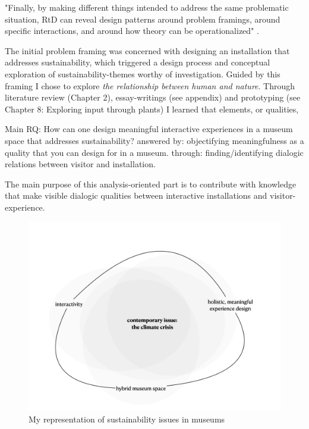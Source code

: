 
"Finally, by making different things intended to address the same problematic situation, RtD can reveal design patterns \autocite{Alexander_book} around problem framings, around specific interactions, and around how theory can be operationalized" \autocite[p. 178]{zimmerman_research_2014}.


The initial problem framing was concerned with designing an installation that addresses sustainability, which triggered a design process and conceptual exploration of sustainability-themes worthy of investigation. Guided by this framing I chose to explore \emph{the relationship between human and nature}. Through literature review (Chapter 2), essay-writings (see appendix) and prototyping (see Chapter 8: Exploring input through plants) I learned that elements, or qualities,


Main RQ: How can one design meaningful interactive experiences in a museum space that addresses sustainability?
answered by: objectifying meaningfulness as a quality that you can design for in a museum.
through: finding/identifying dialogic relations between visitor and installation.


The main purpose of this analysis-oriented part is to contribute with knowledge that make visible dialogic qualities between interactive installations and visitor-experience. 



\begin{figure}[H]
\centering
\includegraphics[width=12.5cm]{pictures/Theory/problem_sphere.png}
\caption{My representation of sustainability issues in museums}
\end{figure}



